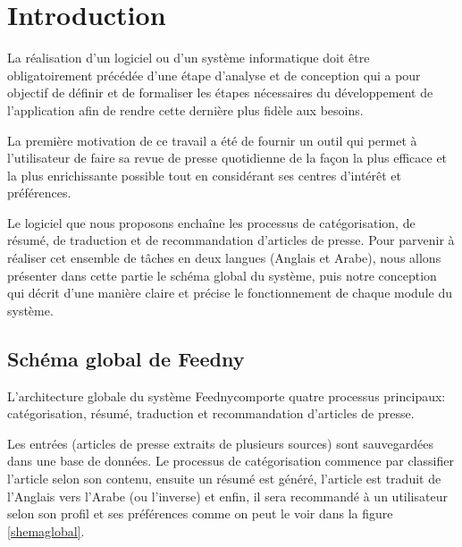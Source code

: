 
\section{Introduction}
La réalisation d'un logiciel ou d'un système informatique doit être obligatoirement précédée d'une étape d'analyse et de conception qui a pour objectif de définir et de formaliser les étapes nécessaires du développement de l'application afin de rendre cette dernière plus fidèle aux besoins.

La première motivation de ce travail a été de fournir un outil qui permet à l'utilisateur de faire sa revue de presse quotidienne de la façon la plus efficace et la plus enrichissante possible tout en considérant ses centres d'intérêt et préférences. 

Le logiciel que nous proposons enchaîne les processus de catégorisation, de résumé, de traduction et de recommandation d'articles de presse. Pour parvenir à réaliser cet ensemble de tâches en deux langues (Anglais et Arabe), nous allons présenter dans cette partie le schéma global du système, puis notre conception qui décrit d'une manière claire et précise le fonctionnement de chaque module du système. 

\newpage
\subsection{Schéma global de \textquotedbl Feedny\textquotedbl}
L'architecture globale du système \textquotedbl Feedny\textquotedbl  comporte quatre processus principaux: catégorisation, résumé, traduction et recommandation d'articles de presse.

Les entrées (articles de presse extraits de plusieurs sources) sont sauvegardées dans une base de données. Le processus de catégorisation commence par classifier l'article selon son contenu, ensuite un résumé est généré, l'article est traduit de l'Anglais vers l'Arabe (ou l'inverse) et enfin, il sera recommandé à un utilisateur selon son profil et ses préférences comme on peut le voir dans la figure \ref{shemaglobal}.

